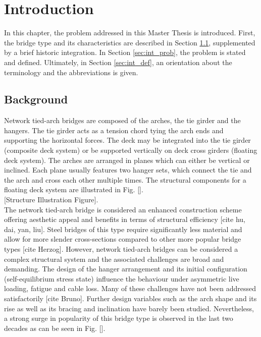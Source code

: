 \section{Introduction}\label{sec:intro}
In this chapter, the problem addressed in this Master Thesis is introduced. First, the bridge type and its characteristics are described in Section \ref{sec:int_back}, supplemented by a brief historic integration. In Section \ref{sec:int_prob}, the problem is stated and defined. Ultimately, in Section \ref{sec:int_def}, an orientation about the terminology and the abbreviations is given. 

\subsection{Background}\label{sec:int_back}
Network tied-arch bridges are composed of the arches, the tie girder and the hangers. The tie girder acts as a tension chord tying the arch ends and supporting the horizontal forces. The deck may be integrated into the tie girder (composite deck system) or be supported vertically on deck cross girders (floating deck system). The arches are arranged in planes which can either be vertical or inclined. Each plane usually features two hanger sets, which connect the tie and the arch and cross each other multiple times. The structural components for a floating deck system are illustrated in Fig. []. \\

[Structure Illustration Figure].\\

The network tied-arch bridge is considered an enhanced construction scheme offering aesthetic appeal and benefits in terms of structural efficiency [cite hu, dai, yan, liu]. Steel bridges of this type require significantly less material and allow for more slender cross-sections compared to other more popular bridge types [cite Herzog]. However, network tied-arch bridges can be considered a complex structural system and the associated challenges are broad and demanding. The design of the hanger arrangement and its initial configuration (self-equilibrium stress state) influence the behaviour under asymmetric live loading, fatigue and cable loss. Many of these challenges have not been addressed satisfactorily [cite Bruno]. Further design variables such as the arch shape and its rise as well as its bracing and inclination have barely been studied. Nevertheless, a strong surge in popularity of this bridge type is observed in the last two decades as can be seen in Fig. [].\\

